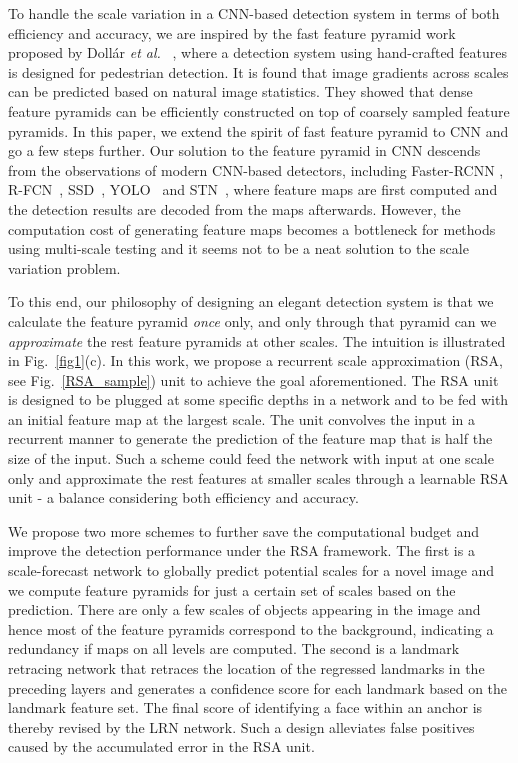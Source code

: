 \documentclass[10pt,twocolumn,letterpaper]{article}
\begin{document}
To handle the scale variation in a CNN-based detection system in terms of both efficiency and accuracy, we are inspired by the fast feature pyramid work proposed by Doll{\'a}r \textit{et al.} ~\cite{dollar2014fast}, where a detection system using hand-crafted features is designed for pedestrian detection. 
It is found that image gradients across scales can be predicted based on natural image statistics. They showed that dense feature pyramids can be efficiently constructed on top of coarsely sampled feature pyramids.  
In this paper, we extend the spirit of fast feature pyramid to CNN and go a few steps further. 
Our solution to the feature pyramid in CNN descends from the observations of modern CNN-based detectors, including Faster-RCNN \cite{faster_rcnn}, R-FCN~\cite{NIPS2016_6465}, SSD~\cite{liu2016ssd}, YOLO~\cite{redmon2016you} and STN~\cite{chen2016supervised}, where
feature maps are first computed and the detection results are decoded from the maps afterwards. 
However, the computation cost of generating  feature maps becomes a bottleneck for methods \cite{overfeat,chen2016supervised} using multi-scale testing and it seems not to be a neat solution to the scale variation problem. 



To this end, our philosophy of designing an elegant detection system is that we calculate the feature pyramid 
\textit{once} only, and only through that pyramid can we \textit{approximate} the rest feature pyramids at other scales. The intuition is illustrated  in Fig.~\ref{fig1}(c). 
In this work, we propose a recurrent scale approximation (RSA, see Fig.~\ref{RSA_sample}) unit to achieve the goal aforementioned. The RSA unit is designed to be plugged at some specific depths in a network and to be fed with an initial feature map at the largest scale. The unit convolves the input in a recurrent manner to generate the prediction of the feature map that is half the size of the input. Such a scheme could feed the network with input at one scale only and approximate the rest features at smaller scales through a learnable RSA unit - a balance considering both efficiency and accuracy.

We propose two more schemes to further save the computational budget and improve the detection performance under the RSA framework.
The first is a scale-forecast network to globally predict  potential scales for a novel image and we compute feature pyramids for just a certain set of scales based on the prediction. There are only a few scales of objects appearing in the image and hence
most of the feature pyramids correspond to the background, indicating a redundancy if maps on all levels 
are computed.
The second is a landmark retracing network that retraces the location 
of the regressed landmarks in the preceding layers and generates a confidence score for each landmark based on the landmark feature set. The final score of identifying a face within an anchor is thereby revised by the LRN network. Such a design alleviates false positives 
caused by the accumulated error in the RSA unit. 
\end{document}
